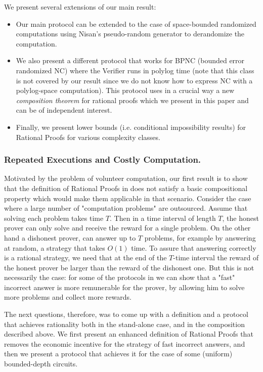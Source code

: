 We present several extensions of our main result:
\begin{itemize}
	
	\item Our main protocol can be extended to the case of space-bounded randomized computations using Nisan's 
	pseudo-random generator \cite{nisan1992pseudorandom} to derandomize the computation. 
	\item We also present a different protocol that works for BPNC (bounded error randomized NC) where the Verifier runs in polylog time (note that this class is not covered by our result since we do not know how to express NC with a polylog-space computation). This protocol uses in a crucial way a new {\em composition theorem} for rational proofs which we present in this paper and can be of independent interest. 
	\item Finally, we present lower bounds (i.e. conditional impossibility results) for Rational Proofs for various complexity classes.
\end{itemize}



\subsubsection{Repeated Executions and Costly Computation.}
Motivated by the problem of volunteer computation, our first
result is to show that the definition of Rational Proofs in \cite{am,am1} does not satisfy a basic compositional property which would make them applicable 
in that scenario. 
Consider the case where a large number of "computation problems" are outsourced. Assume that solving each problem takes time $T$. Then in a time interval of length $T$, the honest prover can only solve and receive the reward for a single problem. On the other hand a dishonest prover, can answer up to $T$ problems, for example by answering at random, a strategy that takes $O(1)$ time. To assure that answering correctly is a rational strategy, we 
need that at the end of the $T$-time interval the reward of the honest prover be larger than the reward of the dishonest one. But this is not necessarily the case: for some of the protocols in \cite{am,am1,ratargs} we can show that a "fast" incorrect answer is more remunerable for the prover, by allowing him to solve more problems and collect more rewards.

The next questions, therefore, was to come up with a definition and a protocol that achieves rationality both in the stand-alone case, and in the composition
described above.  We first present an enhanced definition of Rational Proofs that removes the economic incentive  for the strategy of fast incorrect answers, and then we present a protocol that achieves it for the case of some (uniform) bounded-depth circuits.


